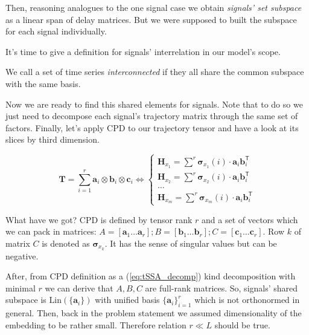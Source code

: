 	Then, reasoning analogues to the one signal case we obtain \emph{signals' set subspace} as a linear span of delay matrices. But we were supposed to built the subspace for each signal individually.
	
	It's time to give a definition for signals' interrelation in our model's scope.
	
	\begin{Def}		
		We call a set of time series \emph{interconnected} if they all share the common subspace with the same basis.
	\end{Def}
	
	Now we are ready to find this shared elements for signals. Note that to do so we just need to decompose each signal's trajectory matrix through the same set of factors. Finally, let's apply CPD to our trajectory tensor and have a look at its slices by third dimension.
	
	\begin{equation}\label{eq:tSSA_decomp}
		\mathbf{T} = \sum\limits_{i = 1}^{r} \mathbf{a}_i \otimes \mathbf{b}_i \otimes \mathbf{c}_i \Leftrightarrow \begin{cases}
			\mathbf{H}_{x_1} = \sum\limits^{r} \boldsymbol{\sigma}_{x_1}(i) \cdot \mathbf{a}_i  \mathbf{b}_i^{\mathsf{T}}  \\
			\mathbf{H}_{x_2} = \sum\limits^{r} \boldsymbol{\sigma}_{x_2}(i) \cdot \mathbf{a}_i  \mathbf{b}_i^{\mathsf{T}} \\
			\ldots \\
			\mathbf{H}_{x_m} = \sum\limits^{r} \boldsymbol{\sigma}_{x_m}(i) \cdot \mathbf{a}_i  \mathbf{b}_i^{\mathsf{T}} 
		\end{cases}
	\end{equation}
	
	What have we got? CPD is defined by tensor rank $ r $ and a set of vectors which we can pack in matrices: $ A = [\mathbf{a}_1 \ldots \mathbf{a}_r]; B = [\mathbf{b}_1 \ldots \mathbf{b}_r]; C = [\mathbf{c}_1 \ldots \mathbf{c}_r] $. Row $ k $ of matrix $ C $ is denoted as $ \boldsymbol{\sigma}_{x_k} $. It has the sense of singular values but can be negative.
	
	After, from CPD definition as a (\ref{eq:tSSA_decomp}) kind decomposition with minimal $ r $ we can derive that $ A, B, C $ are full-rank matrices. So, signals' shared subspace is  $ \text{Lin}(\{\mathbf{a}_i\}) $ with unified basis $ \{\mathbf{a}_i\}_{i = 1}^r $ which is not orthonormed in general. Then, back in the problem statement we assumed dimensionality of the embedding to be rather small. Therefore relation $ r \ll L $ should be true.
	
